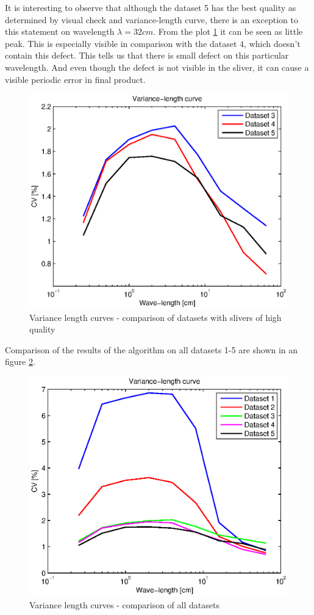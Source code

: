 \documentclass[twoside]{ctuthesis}
\theoremstyle{plain}
\theoremstyle{definition}
\theoremstyle{note}
\begin{document}
It is interesting to observe that although the dataset 5 has the best quality as determined by visual check and variance-length curve, there is an exception to this statement on wavelength $\lambda=32cm$. From the plot \ref{fig:VLC_3_4_5} it can be seen as little peak. This is especially visible in comparison with the dataset 4, which doesn't contain this defect. This tells us that there is small defect on this particular wavelength. And even though the defect is not visible in the sliver, it can cause a visible periodic error in final product.
\begin{figure}[h]
	\centering
	\includegraphics[width=1.0\textwidth]{VLC_curves_3_4_5.eps}
	\caption{Variance length curves - comparison of datasets with slivers of high quality}
	\label{fig:VLC_3_4_5}
\end{figure}

Comparison of the results of the algorithm on all datasets 1-5 are shown in an figure \ref{fig:VLC_all}.
\begin{figure}[h]
	\centering
	\includegraphics[width=1.0\textwidth]{VLC_allCurves.eps}
	\caption{Variance length curves - comparison of all datasets}
	\label{fig:VLC_all}
\end{figure}
\end{document}
